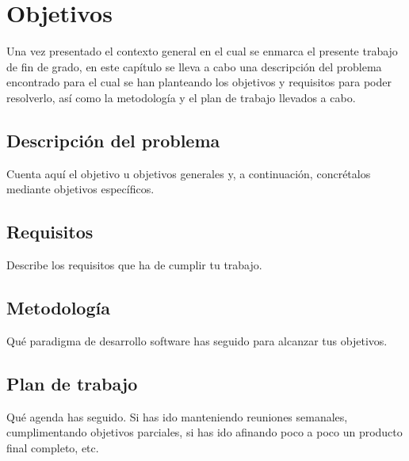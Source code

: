 \chapter{Objetivos}
\label{cap:capitulo2}
Una vez presentado el contexto general en el cual se enmarca el presente trabajo de fin de grado, en este capítulo se lleva a cabo una descripción del problema encontrado para el cual se han planteando los objetivos y requisitos para poder resolverlo, así como la metodología y el plan de trabajo llevados a cabo.\\

\section{Descripción del problema}
\label{sec:descripcion}

Cuenta aquí el objetivo u objetivos generales y, a continuación, concrétalos mediante objetivos específicos.

\section{Requisitos}
\label{sec:requisitos}

Describe los requisitos que ha de cumplir tu trabajo.

\section{Metodología}
\label{sec:metodologia}

Qué paradigma de desarrollo software has seguido para alcanzar tus objetivos.

\section{Plan de trabajo}
\label{sec:plantrabajo}

Qué agenda has seguido. Si has ido manteniendo reuniones semanales, cumplimentando objetivos parciales, si has ido afinando poco a poco un producto final completo, etc.
